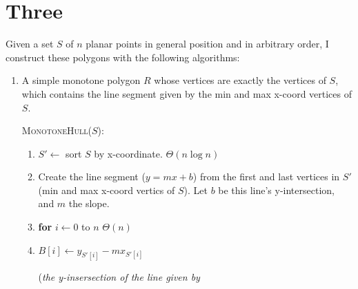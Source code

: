 \documentclass [12pt]{article}
\begin{document}
    \pagebreak


    \section{Three}
    \label{sec:three}

    Given a set $S$ of $n$ planar points in general position and in arbitrary order, I construct these polygons with the following algorithms:

    \begin{enumerate}[label=(\alph*)]
        \item A simple monotone polygon $R$ whose vertices are exactly the vertices of $S$, which contains the line segment given by the min and max x-coord vertices of $S$. 

            \cbstart
            \textsc{MonotoneHull($S$)}:
            \begin{enumerate}[label=\arabic*.]
                \item $S' \leftarrow$ sort $S$ by x-coordinate. $\Theta(n\log n)$
                \item Create the line segment ($y = mx + b$) from the first and last vertices in $S'$ (min and max x-coord vertics of $S$). Let $b$ be this line's y-intersection, and $m$ the slope.
                \item \textbf{for} $i \leftarrow 0$ to $n$ \hspace{1cm}$\Theta(n)$
                \item \hspace{1cm} $B[i] \leftarrow y_{S'[i]} - m x_{S'[i]}$ 
                 
                    \hspace{1cm} (\emph{the y-insersection of the line given by} 
                

\end{enumerate}
\end{enumerate}
\end{document}
